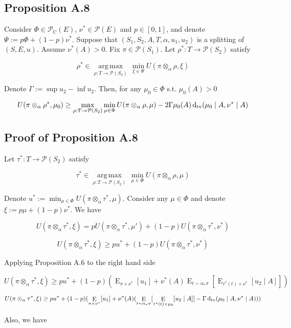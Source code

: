 \documentclass[a4paper]{article}
\DeclareMathOperator{\E}{E}
\newcommand{\Dtv}{\operatorname{d}_{\textnormal{tv}}}
\newcommand{\Argmax}[1]{\underset{#1}{\operatorname{arg\,max}}\,}
\newcommand{\Prob}{\mathcal{P}}
\newcommand{\CC}{\mathcal{P}_{\operatorname{C}}}
\begin{document}
\subsection{Proposition A.8}

Consider ${\Phi \in \CC(E)}$, ${\nu^* \in \Prob(E)}$ and ${p \in [0,1]}$, and denote ${\Psi:=p\Phi+(1-p)\nu^*}$. Suppose that ${(S_1,S_2,A,T,\alpha,u_1,u_2)}$ is a splitting of ${(S,E,u)}$. Assume ${\nu^*(A) > 0}$. Fix ${\pi \in \Prob(S_1)}$.  Let ${\rho^*: T \rightarrow \Prob(S_2)}$ satisfy

$$\rho^* \in \Argmax{\rho: T \rightarrow \Prob(S_2)} \min_{\xi \in \Psi} U(\pi \otimes_\alpha \rho, \xi)$$

Denote ${\Gamma := \sup u_2 - \inf u_2}$. Then, for any ${\mu_0 \in \Phi}$ s.t. ${\mu_0(A) > 0}$

$$U(\pi \otimes_\alpha \rho^*,\mu_0) \geq \max_{\rho: T \rightarrow \Prob(S_2)} \min_{\mu \in \Phi} U(\pi \otimes_\alpha \rho, \mu)-2\Gamma\mu_0(A)\Dtv(\mu_0 \mid A, \nu^* \mid A)$$

\subsection{Proof of Proposition A.8}

Let ${\tau^*: T \rightarrow \Prob(S_2)}$ satisfy

$$\tau^* \in \Argmax{\rho: T \rightarrow \Prob(S_2)} \min_{\mu \in \Phi} U(\pi \otimes_\alpha \rho, \mu)$$

Denote ${u^*:= \min_{\mu \in \Phi} U(\pi \otimes_\alpha \tau^*, \mu)}$. Consider any ${\mu \in \Phi}$ and denote ${\xi:=p\mu+(1-p)\nu^*}$. We have

$$U(\pi \otimes_\alpha \tau^*, \xi) = p U(\pi \otimes_\alpha \tau^*, \mu') + (1-p) U(\pi \otimes_\alpha \tau^*, \nu^*)$$

$$U(\pi \otimes_\alpha \tau^*, \xi) \geq pu^* + (1-p) U(\pi \otimes_\alpha \tau^*, \nu^*)$$

Applying Proposition A.6 to the right hand side

$$U(\pi \otimes_\alpha \tau^*, \xi) \geq pu^* + (1-p) (\E_{\pi \times \nu^*}[u_1] + \nu^*(A)\E_{t \sim \alpha_* \pi}[\E_{\tau^*(t) \times \nu^*}[u_2 \mid A]])$$

$$U(\pi \otimes_\alpha \tau^*, \xi) \geq pu^* + (1-p) (\E_{\pi \times \nu^*}[u_1] + \nu^*(A)(\E_{t \sim \alpha_* \pi}[\E_{\tau^*(t) \times \mu_0}[u_2 \mid A]]- \Gamma\Dtv(\mu_0 \mid A, \nu^* \mid A)))$$

Also, we have
\end{document}
